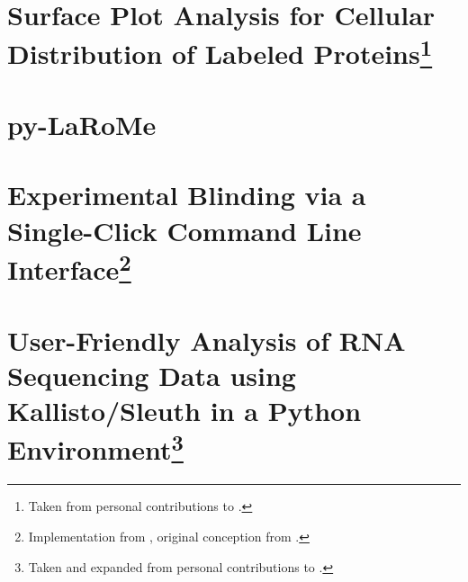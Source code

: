 \section[Surface Plot Analysis for Cellular Distribution of Labeled Proteins]{Surface Plot Analysis for Cellular Distribution of Labeled Proteins\footnote{Taken from personal contributions to \citep{Saelens2022}.}}

\section{py-LaRoMe}\label{larome}

\section[Experimental Blinding via a Single-Click Command Line Interface]{Experimental Blinding via a Single-Click Command Line Interface\footnote{Implementation from \citep{Brewer2022}, original conception from \citep{Salter2016}.}}\label{blinders}

\section[User-Friendly Analysis of RNA Sequencing Data using Kallisto/Sleuth in a Python Environment]{User-Friendly Analysis of RNA Sequencing Data using Kallisto/Sleuth in a Python Environment\footnote{Taken and expanded from personal contributions to \citep{Saelens2022}.}}\label{rnaseq}

